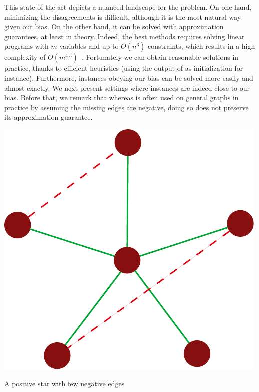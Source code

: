 This state of the art depicts a nuanced landscape for the \pcc{} problem. On one hand, minimizing
the disagreements is difficult, although it is the most natural way given our bias. On the other
hand, it can be solved with approximation guarantees, at least in theory. Indeed, the best methods
requires solving linear programs with $m$ variables and up to $O(n^3)$ constraints, which results in
a high complexity of $O(m^{4.5})$~\autocite[Section 7.2]{LPBook07}. Fortunately we can obtain
reasonable solutions in practice, thanks to efficient heuristics (using the output of \ccpivot{} as
initialization for instance). Furthermore, instances obeying our bias can be solved more easily and
almost exactly. We next present settings where instances are indeed close to our bias.
Before that, we remark that whereas \ccpivot{} is often used on general graphs in practice by
assuming the missing edges are negative, doing so does not preserve its approximation guarantee.
\begin{marginfigure}
  \centering
  \includegraphics[width=\linewidth]{assets/raw/pivotstar.pdf}
  \caption{A positive star with few negative edges}
  \label{fig:cc_star_pivot}
\end{marginfigure}

